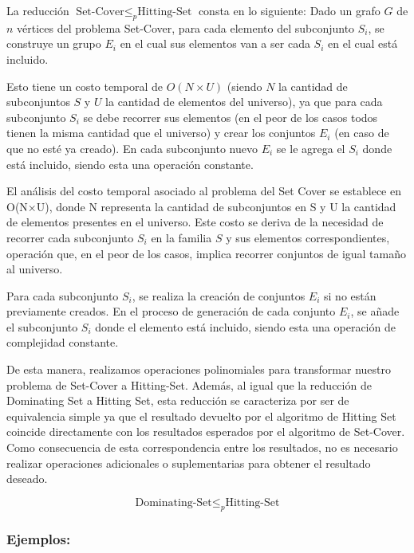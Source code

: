 La reducción $\text{Set-Cover} \leq_{p} \text{Hitting-Set}$ consta en lo siguiente:
Dado un grafo $G$ de $n$ vértices del problema Set-Cover, para cada elemento del subconjunto $S_{i}$, se construye un grupo $E_{i}$ en el cual sus elementos van a ser cada $S_i$ en el cual está incluido. 

Esto tiene un costo temporal de $O(N \times U)$ (siendo $N$ la cantidad de subconjuntos $S$ y $U$ la cantidad de elementos del universo), ya que para cada subconjunto $S_{i}$ se debe recorrer sus elementos (en el peor de los casos todos tienen la misma cantidad que el universo) y crear los conjuntos $E_{i}$ (en caso de que no esté ya creado). En cada subconjunto nuevo $E_i$ se le agrega el $S_i$ donde está incluido, siendo esta una operación constante. 

El análisis del costo temporal asociado al problema del Set Cover se establece en O(N×U), donde N representa la cantidad de subconjuntos en S y U la cantidad de elementos presentes en el universo. Este costo se deriva de la necesidad de recorrer cada subconjunto $S_i$ en la familia $S$ y sus elementos correspondientes, operación que, en el peor de los casos, implica recorrer conjuntos de igual tamaño al universo.

Para cada subconjunto $S_i$, se realiza la creación de conjuntos $E_i$ si no están previamente creados. En el proceso de generación de cada conjunto $E_i$, se añade el subconjunto $S_i$ donde el elemento está incluido, siendo esta una operación de complejidad constante. 

De esta manera, realizamos operaciones polinomiales para transformar nuestro problema de Set-Cover a Hitting-Set. Además, al igual que la reducción de Dominating Set a Hitting Set, esta reducción se caracteriza por ser de equivalencia simple ya que el resultado devuelto por el algoritmo de Hitting Set coincide directamente con los resultados esperados por el algoritmo de Set-Cover. Como consecuencia de esta correspondencia entre los resultados, no es necesario realizar operaciones adicionales o suplementarias para obtener el resultado deseado.


\[\text{Dominating-Set}  \leq _{p} \text{Hitting-Set}\]

\subsubsection{Ejemplos:} 

